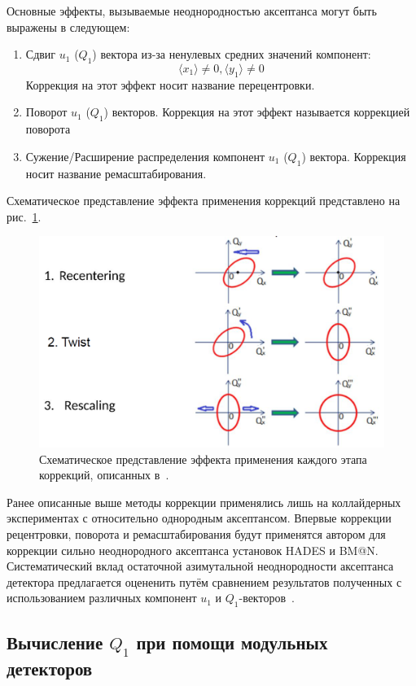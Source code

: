 Основные эффекты, вызываемые неоднородностью аксептанса могут быть выражены в следующем:
\begin{enumerate}
    \item Сдвиг $u_1$ ($Q_1$) вектора из-за ненулевых средних значений компонент:
    \begin{equation}
        \langle x_1 \rangle \ne 0, \langle y_1 \rangle \ne 0
    \end{equation}
    Коррекция на этот эффект носит название перецентровки.
    \item Поворот $u_1$ ($Q_1$) векторов. Коррекция на этот эффект называется коррекцией поворота
    \item Сужение/Расширение распределения компонент $u_1$ ($Q_1$) вектора. Коррекция носит название ремасштабирования.
\end{enumerate}
Схематическое представление эффекта применения коррекций представлено на рис.~\ref{fig:qn_corrections}.

\begin{figure}[h]
    \centering
    \includegraphics[width=0.5\linewidth]{images/corrections_for_nonuniformity.png}
    \caption{Схематическое представление эффекта применения каждого этапа коррекций, описанных в~\cite{Selyuzhenkov:2007zi}.}
    \label{fig:qn_corrections}
\end{figure}
Ранее описанные выше методы коррекции применялись лишь на коллайдерных экспериментах с относительно однородным аксептансом. 
Впервые коррекции рецентровки, поворота и ремасштабирования будут применятся автором для коррекции сильно неоднородного аксептанса установок HADES и BM@N.
Систематический вклад остаточной азимутальной неоднородности аксептанса детектора предлагается оцененить путём сравнением результатов полученных с использованием различных компонент $u_1$ и $Q_1$-векторов~\cite{Mamaev:2020qom,Mamaev:2023yhz}. 

\subsection{Вычисление $Q_1$ при помощи модульных детекторов}

